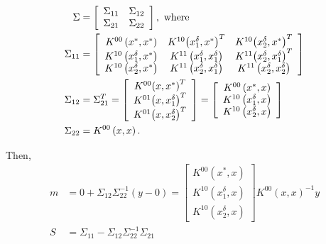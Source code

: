 \documentclass{sfuthesis}
\begin{document}
\begin{align}
\Sigma &= \left[ {\begin{array}{*{20}{c}}
{{\Sigma _{11}}}&{{\Sigma _{12}}}\\
{{\Sigma _{21}}}&{{\Sigma _{22}}} 
\end{array}} \right], \rm{\ where} \\
{\Sigma _{11}} &= \left[ {\begin{array}{*{20}{c}}
{{K^{00}}\left( {{x^*},{x^*}} \right)}&{{K^{10}}{{\left( {x_1^\delta ,{x^*}} \right)}^T}}&{{K^{10}}{{\left( {x_2^\delta ,{x^*}} \right)}^T}}\\
{{K^{10}}\left( {x_1^\delta ,{x^*}} \right)}&{{K^{11}}\left( {x_1^\delta ,x_1^\delta } \right)}&{{K^{11}}{{\left( {x_2^\delta ,x_1^\delta } \right)}^T}}\\
{{K^{10}}\left( {x_2^\delta ,{x^*}} \right)}&{{K^{11}}\left( {x_2^\delta ,x_1^\delta } \right)}&{{K^{11}}\left( {x_2^\delta ,x_2^\delta } \right)}
\end{array}} \right]\\
{\Sigma _{12}} &= \Sigma _{21}^T = \left[ {\begin{array}{*{20}{c}}
{{K^{00}}{{\left( {x,{x^*}} \right)}^T}}\\
{{K^{01}}{{\left( {x,x_1^\delta } \right)}^T}}\\
{{K^{01}}{{\left( {x,x_2^\delta } \right)}^T}}
\end{array}} \right] = \left[ {\begin{array}{*{20}{c}}
{{K^{00}}\left( {{x^*},x} \right)}\\
{{K^{10}}\left( {x_1^\delta ,x} \right)}\\
{{K^{10}}\left( {x_2^\delta ,x} \right)}
\end{array}} \right]\\
{\Sigma _{22}} &= {K^{00}}\left( {x,x} \right).
\end{align}

Then,
\begin{align}
m &= 0 + {\Sigma _{12}}\Sigma _{22}^{ - 1}\left( {y - 0} \right) = \left[ {\begin{array}{*{20}{c}}
{{K^{00}}\left( {{x^*},x} \right)}\\
{{K^{10}}\left( {x_1^\delta ,x} \right)}\\
{{K^{10}}\left( {x_2^\delta ,x} \right)}
\end{array}} \right]{K^{00}}{\left( {x,x} \right)^{ - 1}}y\\
S &= {\Sigma _{11}} - {\Sigma _{12}}\Sigma _{22}^{ - 1}{\Sigma _{21}}  
\end{align}
\end{document}
